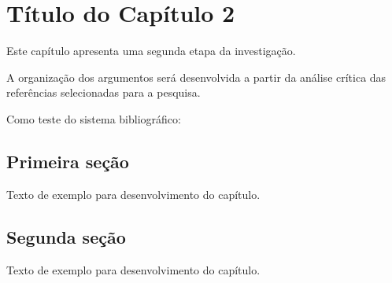 \chapter{Título do Capítulo 2}

Este capítulo apresenta uma segunda etapa da investigação.

A organização dos argumentos será desenvolvida a partir da análise
crítica das referências selecionadas para a pesquisa.

Como teste do sistema bibliográfico:

\cite{dask2}

\section{Primeira seção}

Texto de exemplo para desenvolvimento do capítulo.

\section{Segunda seção}

Texto de exemplo para desenvolvimento do capítulo.